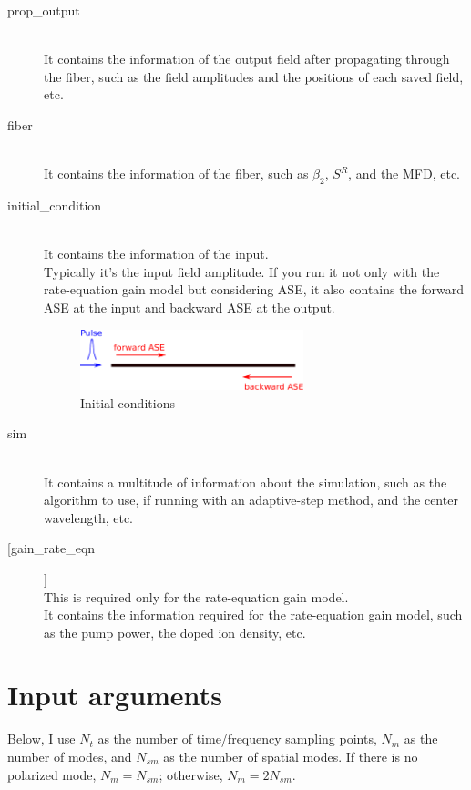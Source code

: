 \documentclass[12pt,hidelinks]{book}
\begin{document}
\begin{description}
\item[prop\_output]\mbox{}\\
It contains the information of the output field after propagating through the fiber, such as the field amplitudes and the positions of each saved field, etc.

\item[fiber]\mbox{}\\
It contains the information of the fiber, such as $\beta_2$, $S^R$, and the MFD, etc.

\item[initial\_condition]\mbox{}\\
It contains the information of the input.\\
Typically it's the input field amplitude. If you run it not only with the rate-equation gain model but considering ASE, it also contains the forward ASE at the input and backward ASE at the output.

\begin{figure}[h!]
\centering
\includegraphics[height=50pt]{initial_condition.pdf}
\caption{Initial conditions}
\label{fig:initial_condition}
\end{figure}

\item[sim]\mbox{}\\
It contains a multitude of information about the simulation, such as the algorithm to use, if running with an adaptive-step method, and the center wavelength, etc.

\item[[gain\_rate\_eqn]]\mbox{}\\
This is required only for the rate-equation gain model.\\
It contains the information required for the rate-equation gain model, such as the pump power, the doped ion density, etc.

\end{description}

\chapter{Input arguments}

Below, I use $N_t$ as the number of time/frequency sampling points, $N_m$ as the number of modes, and $N_{sm}$ as the number of spatial modes. If there is no polarized mode, $N_m=N_{sm}$; otherwise, $N_m=2N_{sm}$.
\end{document}
